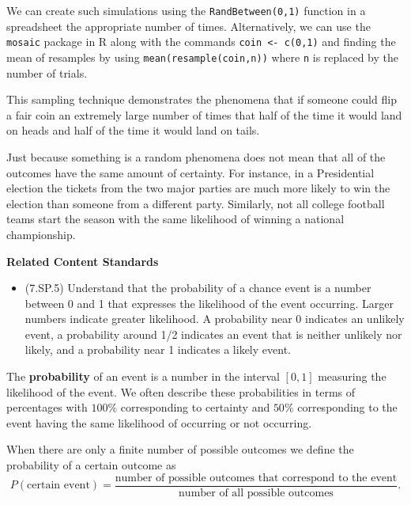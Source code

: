 \documentclass[
]{book}
\providecommand{\tightlist}{%
  \setlength{\itemsep}{0pt}\setlength{\parskip}{0pt}}
\newenvironment{standards}{}{}
\theoremstyle{definition}
\theoremstyle{definition}
\theoremstyle{definition}
\theoremstyle{definition}
\theoremstyle{remark}
\begin{document}
We can create such simulations using the \texttt{RandBetween(0,1)} function in a spreadsheet the appropriate number of times. Alternatively, we can use the \texttt{mosaic} package in R along with the commands \texttt{coin\ \textless{}-\ c(0,1)} and finding the mean of resamples by using \texttt{mean(resample(coin,n))} where \texttt{n} is replaced by the number of trials.

This sampling technique demonstrates the phenomena that if someone could flip a fair coin an extremely large number of times that half of the time it would land on heads and half of the time it would land on tails.

Just because something is a random phenomena does not mean that all of the outcomes have the same amount of certainty. For instance, in a Presidential election the tickets from the two major parties are much more likely to win the election than someone from a different party. Similarly, not all college football teams start the season with the same likelihood of winning a national championship.

\begin{standards}

\begin{center}
\textbf{Related Content Standards}

\end{center}

\begin{itemize}
\tightlist
\item
  (7.SP.5) Understand that the probability of a chance event is a number between 0 and 1 that expresses the likelihood of the event occurring. Larger numbers indicate greater likelihood. A probability near 0 indicates an unlikely event, a probability around 1/2 indicates an event that is neither unlikely nor likely, and a probability near 1 indicates a likely event.
\end{itemize}

\end{standards}

The \textbf{probability} of an event is a number in the interval \([0,1]\) measuring the likelihood of the event. We often describe these probabilities in terms of percentages with \(100\%\) corresponding to certainty and \(50\%\) corresponding to the event having the same likelihood of occurring or not occurring.

When there are only a finite number of possible outcomes we define the probability of a certain outcome as
\[P(\mbox{certain event}) = \frac{\mbox{number of possible outcomes that correspond to the event}}{\mbox{number of all possible outcomes}}.\]
\end{document}
